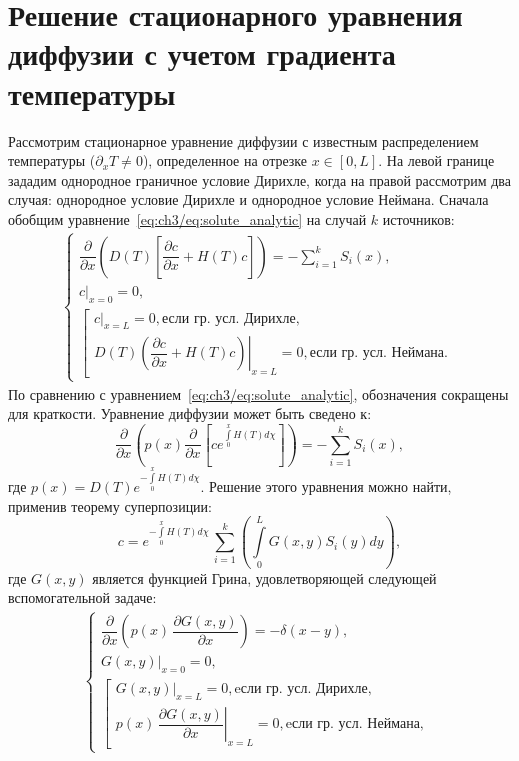 \chapter{Решение стационарного уравнения диффузии с учетом градиента температуры}\label{app:D}

Рассмотрим стационарное уравнение диффузии с известным распределением температуры ($\partial_x T \neq 0$), определенное на отрезке \( x \in [0, L] \). На левой границе зададим однородное граничное условие Дирихле, когда на правой рассмотрим два случая: однородное условие Дирихле и однородное условие Неймана. Сначала обобщим уравнение~\eqref{eq:ch3/eq:solute_analytic} на случай $k$ источников:
\begin{align}
	\label{eq:general_stat_dif}
	\begin{cases}
		\dfrac{\partial}{\partial x}\left( D(T)\left[ \dfrac{\partial c}{\partial x} + H(T)c\right]\right)=-\sum\limits_{i=1}^k S_i(x), \\[5pt]
		\left.c\right\vert_{x=0}=0,                                                                                                     \\[5pt]
		\left[\begin{array}{ll}
			      \left.c\right\vert_{x=L}=0,  \text{если гр. усл. Дирихле}, \\[5pt]
			      \left.D(T)\left( \dfrac{\partial c}{\partial x} + H(T)c\right)\right\vert_{x=L}=0,  \text{если гр. усл. Неймана}.
		      \end{array}
		\right.
	\end{cases}
\end{align}
По сравнению с уравнением~\eqref{eq:ch3/eq:solute_analytic}, обозначения сокращены для краткости. Уравнение диффузии может быть сведено к:
\begin{equation}
	\frac{\partial}{\partial x}\left(p(x)\frac{\partial}{\partial x}\left[ ce^{\int\limits_0^x H(T)d\chi}\right]\right)=-\sum\limits_{i=1}^k S_i(x),
\end{equation}
где $p(x)=D(T)e^{-\int\limits_0^x H(T)d\chi}$. Решение этого уравнения можно найти, применив теорему суперпозиции:
\begin{equation}
	\label{eq:ST}
	c=e^{-\int\limits_0^x H(T)d\chi}\,\sum\limits_{i=1}^k \left( \int\limits_0^L G(x,y)S_i(y)dy \right),
\end{equation}
где $G(x,y)$ является функцией Грина, удовлетворяющей следующей вспомогательной задаче:
\begin{align}
	\label{eq:Green_problem}
	\begin{cases}
		\dfrac{\partial}{\partial x}\left(p(x)\,\dfrac{\partial G(x,y)}{\partial x}\right)=-\delta(x-y), \\[5pt]
		\left.G(x,y)\right\vert_{x=0}=0,                                                                 \\[5pt]
		\left[\begin{array}{ll}
			      \left.G(x,y)\right\vert_{x=L}=0,  \text{eсли гр. усл. Дирихле}, \\[5pt]
			      \left.p(x)\,\dfrac{\partial G(x,y)}{\partial x}\right\vert_{x=L}=0,  \text{eсли гр. усл. Неймана},
		      \end{array}\right.
	\end{cases}
\end{align}
